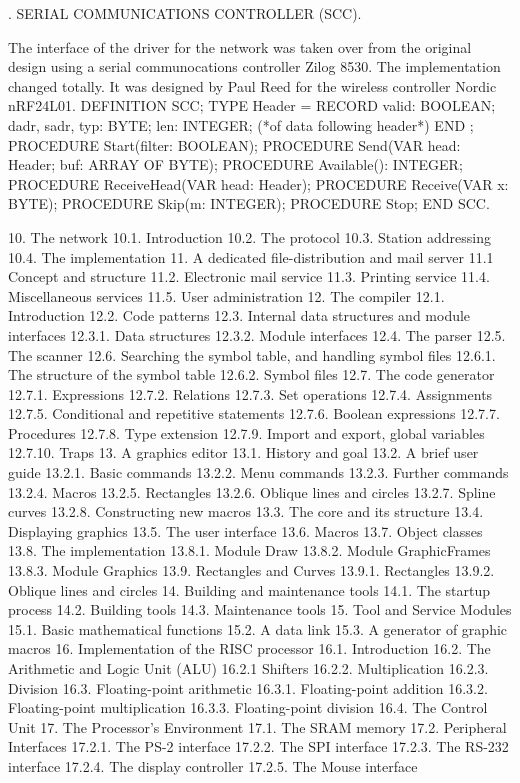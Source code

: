 . SERIAL COMMUNICATIONS CONTROLLER (SCC).

The interface of the driver for the network was taken over from the original design using a serial communocations controller Zilog 8530. The implementation changed totally. It was designed by Paul Reed for the wireless controller Nordic nRF24L01.
\begintt
DEFINITION SCC;
TYPE Header =
RECORD valid: BOOLEAN; dadr, sadr, typ: BYTE;
len: INTEGER; (*of data following header*) END ;
PROCEDURE Start(filter: BOOLEAN);
PROCEDURE Send(VAR head: Header; buf: ARRAY OF BYTE); PROCEDURE Available(): INTEGER;
PROCEDURE ReceiveHead(VAR head: Header);
PROCEDURE Receive(VAR x: BYTE);
PROCEDURE Skip(m: INTEGER);
PROCEDURE Stop;
END SCC.
\endtt


10. The network
10.1. Introduction
10.2. The protocol
10.3. Station addressing
10.4. The implementation
11. A dedicated file-distribution and mail server
11.1 Concept and structure
11.2. Electronic mail service
11.3. Printing service
11.4. Miscellaneous services
11.5. User administration
12. The compiler
12.1. Introduction
12.2. Code patterns
12.3. Internal data structures and module interfaces
12.3.1. Data structures
12.3.2. Module interfaces
12.4. The parser
12.5. The scanner
12.6. Searching the symbol table, and handling symbol files
12.6.1. The structure of the symbol table
12.6.2. Symbol files
12.7. The code generator
12.7.1. Expressions
12.7.2. Relations
12.7.3. Set operations
12.7.4. Assignments
12.7.5. Conditional and repetitive statements
12.7.6. Boolean expressions
12.7.7. Procedures
12.7.8. Type extension
12.7.9. Import and export, global variables
12.7.10. Traps
13. A graphics editor
13.1. History and goal
13.2. A brief user guide
13.2.1. Basic commands
13.2.2. Menu commands
13.2.3. Further commands
13.2.4. Macros
13.2.5. Rectangles
13.2.6. Oblique lines and circles
13.2.7. Spline curves
13.2.8. Constructing new macros
13.3. The core and its structure
13.4. Displaying graphics
13.5. The user interface
13.6. Macros
13.7. Object classes
13.8. The implementation
13.8.1. Module Draw
13.8.2. Module GraphicFrames
13.8.3. Module Graphics
13.9. Rectangles and Curves
13.9.1. Rectangles
13.9.2. Oblique lines and circles
14. Building and maintenance tools
14.1. The startup process
14.2. Building tools
14.3. Maintenance tools
15. Tool and Service Modules
15.1. Basic mathematical functions
15.2. A data link
15.3. A generator of graphic macros
16. Implementation of the RISC processor
16.1. Introduction
16.2. The Arithmetic and Logic Unit (ALU)
16.2.1 Shifters
16.2.2. Multiplication
16.2.3. Division
16.3. Floating-point arithmetic
16.3.1. Floating-point addition
16.3.2. Floating-point multiplication
16.3.3. Floating-point division
16.4. The Control Unit
17. The Processor's Environment
17.1. The SRAM memory
17.2. Peripheral Interfaces
17.2.1. The PS-2 interface
17.2.2. The SPI interface
17.2.3. The RS-232 interface
17.2.4. The display controller
17.2.5. The Mouse interface

\bye

